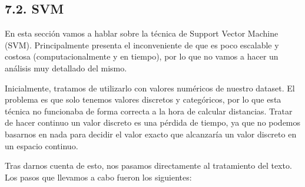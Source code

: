 \documentclass[spanish,]{article}
\begin{document}
\subsection{7.2. SVM}\label{svm}

En esta sección vamos a hablar sobre la técnica de Support Vector
Machine (SVM). Principalmente presenta el inconveniente de que es poco
escalable y costosa (computacionalmente y en tiempo), por lo que no
vamos a hacer un análisis muy detallado del mismo.

Inicialmente, tratamos de utilizarlo con valores numéricos de nuestro
dataset. El problema es que solo tenemos valores discretos y
categóricos, por lo que esta técnica no funcionaba de forma correcta a
la hora de calcular distancias. Tratar de hacer continuo un valor
discreto es una pérdida de tiempo, ya que no podemos basarnos en nada
para decidir el valor exacto que alcanzaría un valor discreto en un
espacio continuo.

Tras darnos cuenta de esto, nos pasamos directamente al tratamiento del
texto. Los pasos que llevamos a cabo fueron los siguientes:
\end{document}
